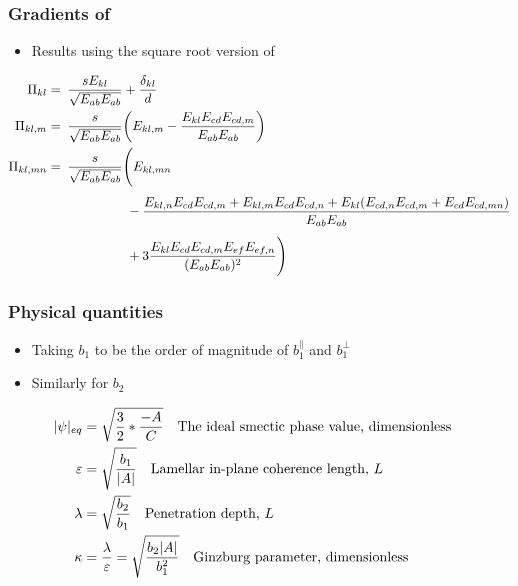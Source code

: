 \documentclass[10pt,mathserif]{beamer}
\begin{document}
\begin{frame}
    \frametitle{Gradients of \PP}
    \begin{itemize}
        \item Results using the square root version of \PP
    \end{itemize}
    \scriptsize
    \begin{align*}
        \Pi_{kl} =&\enspace \frac{s E_{kl}}{\sqrt{E_{ab}E_{ab}}} + \frac{\delta_{kl}}{d} \\
        \Pi_{kl,m} =&\enspace \frac{s}{\sqrt{E_{ab}E_{ab}}} \qty(E_{kl,m} - \frac{E_{kl}E_{cd}E_{cd,m}}{E_{ab}E_{ab}}) \\
        \Pi_{kl,mn} =&\enspace \frac{s}{\sqrt{E_{ab}E_{ab}}} \Biggl(E_{kl,mn} \\ 
        &\phantom{\frac{s}{\sqrt{E_{ab}E_{ab}}} \Biggl(} -\frac{E_{kl,n}E_{cd}E_{cd,m} + E_{kl,m}E_{cd}E_{cd,n} + E_{kl}(E_{cd,n}E_{cd,m} + E_{cd}E_{cd,mn})}{E_{ab}E_{ab}} \\
        &\phantom{\frac{s}{\sqrt{E_{ab}E_{ab}}} \Biggl(} + 3\frac{E_{kl}E_{cd}E_{cd,m}E_{ef}E_{ef,n}}{(E_{ab}E_{ab})^2} \Biggr)
    \end{align*}
    \normalsize
\end{frame}

\begin{frame}
    \frametitle{Physical quantities}
    \begin{itemize}
        \item Taking $b_1$ to be the order of magnitude of $b_1^\parallel$ and $b_1^\perp$
        \item Similarly for $b_2$
    \end{itemize}
    \small
    \begin{align*}
        |\psi|_{eq} &= \sqrt{\frac{3}{2} * \frac{-A}{C}} \qq{The ideal smectic phase value, dimensionless}\\
        \varepsilon &= \sqrt{\frac{b_1}{|A|}} \qq{Lamellar in-plane coherence length, $L$} \\
        \lambda &= \sqrt{\frac{b_2}{b_1}} \qq{Penetration depth, $L$} \\
        \kappa &= \frac{\lambda}{\varepsilon} = \sqrt{\frac{b_2|A|}{b_1^2}} \qq{Ginzburg parameter, dimensionless}
    \end{align*}
\end{frame}
\end{document}
